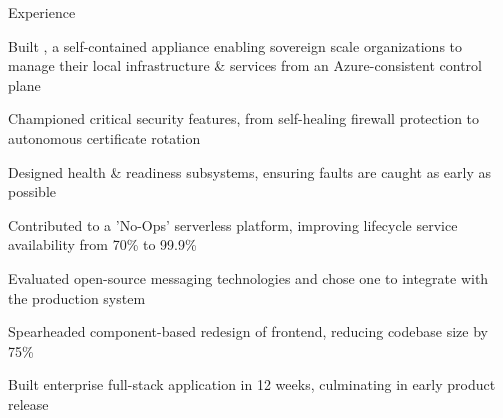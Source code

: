 \documentclass{resume} %
\begin{document}

    \begin{rSection}{Experience}

        \company{\microsoft}{\seattle}
                \begin{rList}
		    \item Built {\aldo}, a self-contained appliance enabling sovereign scale organizations to
			manage their local infrastructure \& services from an Azure-consistent
			control plane
		    \item Championed critical security features, from self-healing firewall protection
			to autonomous certificate rotation
		    \item Designed health \& readiness subsystems, ensuring faults
			are caught as early as possible
                \end{rList}
                \begin{rList}
		    \item Contributed to a 'No-Ops' serverless platform, improving lifecycle
			service availability from 70\% to 99.9\%
                \end{rList}
                \begin{rList}
                    \item Evaluated open-source messaging technologies
                        and chose one to integrate with the production system
                \end{rList}
        \vspace{0.5em}


        \company{\lefttravel}{\la}
                \begin{rList}
                    \item Spearheaded component-based redesign of frontend,
                        reducing codebase size by 75\%
                    \item Built enterprise full-stack application in 12 weeks, culminating in early
                        product release
                \end{rList}
        \vspace{0.5em}

    \end{rSection}
\end{document}
